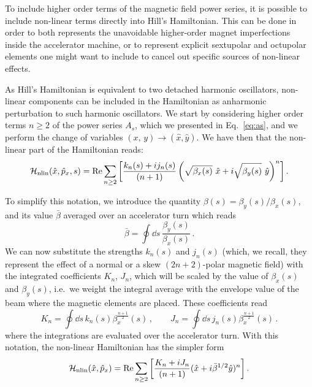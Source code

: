 To include higher order terms of the magnetic field power series, it is possible to include non-linear terms directly into Hill's Hamiltonian. This can be done in order to both represents the unavoidable higher-order magnet imperfections inside the accelerator machine, or to represent explicit sextupolar and octupolar elements one might want to include to cancel out specific sources of non-linear effects. 

As Hill's Hamiltonian is equivalent to two detached harmonic oscillators, non-linear components can be included in the Hamiltonian as anharmonic perturbation to such harmonic oscillators. We start by considering higher order terms $n \ge 2$ of the power series $A_s$, which we presented in Eq.~\eqref{eq:as}, and we perform the change of variables $(x,\,y) \to (\hat x, \hat y)$. We have then that the non-linear part of the Hamiltonian reads:
%
\begin{equation}
    \mathcal{H}_\text{nlin}(\hat x, \hat p_x, s) = \Re \sum_{n\ge 2} \qty[\frac{k_n(s) + ij_n(s)}{(n+1)} \left(\sqrt{\beta_x(s)}\ \hat x + i\sqrt{\beta_y(s)}\ \hat y\right)^n]\,.
\end{equation}  

To simplify this notation, we introduce the quantity $\beta(s)=\beta_y(s)/\beta_x(s)$, and its value $\bar\beta$ averaged over an accelerator turn which reads
\begin{equation}
    \bar\beta = \oint \dd s\, \frac{\beta_y(s)}{\beta_x(s)} \,.
\end{equation}
We can now substitute the strengths $k_n(s)$ and $j_n(s)$ (which, we recall, they represent the effect of a normal or a skew $(2n+2)$-polar magnetic field) with the integrated coefficients $K_n$, $J_n$, which will be scaled by the value of $\beta_x(s)$ and $\beta_y(s)$, i.e.\ we weight the integral average with the envelope value of the beam where the magnetic elements are placed. These coefficients read
%
\begin{equation} 
	K_n = \oint \dd s\, k_n(s) \beta_x^{\frac{n+1}{2}}(s)\,,\qquad
	J_n = \oint \dd s\, j_n(s) \beta_x^{\frac{n+1}{2}}(s)\,.
\end{equation} 
%
where the integrations are evaluated over the accelerator turn. With this notation, the non-linear Hamiltonian has the simpler form
% 
\begin{equation} \mathcal{H}_\text{nlin}(\hat x, \hat p_x) = \Re \sum_{n\ge 2} \qty[\frac{K_n + iJ_n}{(n+1)} (\hat x + i\bar\beta^{1/2} \hat y)^n]\,.\end{equation}

